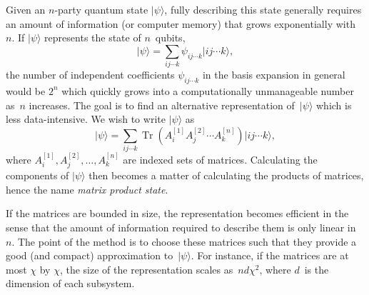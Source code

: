 \documentclass[aps,pra,12pt,nofootinbib,superscriptaddress,longbibliography]{revtex4-1}
\DeclareMathOperator{\trace}{Tr}  %
\theoremstyle{plain}
\theoremstyle{definition}
\newcommand{\ket}[1]{\mbox{$|#1\rangle$}}
\newcommand{\be}{\begin{equation}}
\newcommand{\ee}{\end{equation}}
\begin{document}
Given an $n$-party quantum state $\ket{\psi}$, fully describing this state generally requires an
amount of information (or computer memory) that grows exponentially with~$n$.
If $\ket{\psi}$ represents the state of $n$~qubits,
\be 
\ket{\psi}= \sum_{i j \cdots k}\psi_{i j \cdots k}\ket{i j \cdots k},
\ee 
the number of independent coefficients $\psi_{i j \cdots k}$ in the basis expansion in general would be $2^n$
which quickly grows into a computationally unmanageable number as~$n$ increases.
The goal is to find an alternative representation of~$\ket{\psi}$ which is less data-intensive.
We wish to write $\ket{\psi}$ as 
\begin{equation}\label{eqn:matrix}
\ket{\psi} = \sum_{i j \cdots k} \trace(A_{i}^{[1]} A_{j}^{[2]} \cdots A_{k}^{[n]}) \ket{i j \cdots k},
\end{equation}
where $A_{i}^{[1]}, A_{j}^{[2]}, \ldots, A_{k}^{[n]}$ are indexed sets of matrices.
Calculating the components of $\ket{\psi}$ then becomes a matter of calculating the products of matrices,
hence the name \emph{matrix product state}.

If the matrices are bounded in size, the representation becomes efficient
in the sense that the amount of information required to describe them is only linear in~$n$.
The point of the method is to choose these matrices such that they provide a good (and compact) approximation to~$\ket{\psi}$.
For instance, if the matrices are at most $\chi$ by $\chi$, the size of the representation scales as~$n d \chi^2$,
where $d$~is the dimension of each subsystem.

\end{document}
